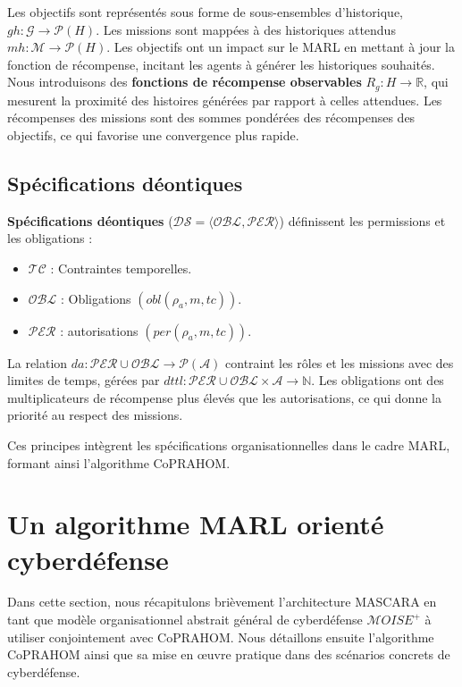 Les objectifs sont représentés sous forme de sous-ensembles d'historique, $gh: \mathcal{G} \rightarrow \mathcal{P}(H)$. Les missions sont mappées à des historiques attendus $mh: \mathcal{M} \rightarrow \mathcal{P}(H)$. Les objectifs ont un impact sur le MARL en mettant à jour la fonction de récompense, incitant les agents à générer les historiques souhaités. Nous introduisons des \textbf{fonctions de récompense observables} $R_g: H \rightarrow \mathbb{R}$, qui mesurent la proximité des histoires générées par rapport à celles attendues. Les récompenses des missions sont des sommes pondérées des récompenses des objectifs, ce qui favorise une convergence plus rapide.

\subsection{Spécifications déontiques}

\textbf{Spécifications déontiques} ($\mathcal{DS} = \langle \mathcal{OBL}, \mathcal{PER} \rangle$) définissent les permissions et les obligations :
\begin{itemize}
    \item $\mathcal{TC}$ : Contraintes temporelles.
    \item $\mathcal{OBL}$ : Obligations $(obl(\rho_a, m, tc))$.
    \item $\mathcal{PER}$ : autorisations $(per(\rho_a, m, tc))$.
\end{itemize}

La relation $da: \mathcal{PER} \cup \mathcal{OBL} \rightarrow \mathcal{P}(\mathcal{A})$ contraint les rôles et les missions avec des limites de temps, gérées par $dttl: \mathcal{PER} \cup \mathcal{OBL} \times \mathcal{A} \rightarrow \mathbb{N}$. Les obligations ont des multiplicateurs de récompense plus élevés que les autorisations, ce qui donne la priorité au respect des missions.

Ces principes intègrent les spécifications organisationnelles dans le cadre MARL, formant ainsi l'algorithme CoPRAHOM.

\section{Un algorithme MARL orienté cyberdéfense}\label{sec:coprahom}

Dans cette section, nous récapitulons brièvement l'architecture MASCARA en tant que modèle organisationnel abstrait général de cyberdéfense $\mathcal{M}OISE^+$ à utiliser conjointement avec CoPRAHOM.
Nous détaillons ensuite l'algorithme CoPRAHOM ainsi que sa mise en œuvre pratique dans des scénarios concrets de cyberdéfense.


